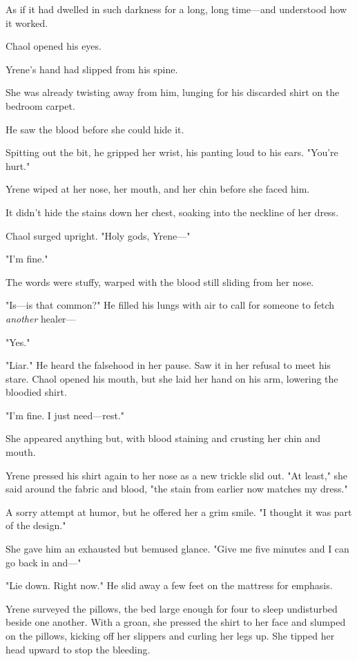 As if it had dwelled in such darkness for a long, long time---and understood how it worked.

Chaol opened his eyes.

Yrene's hand had slipped from his spine.

She was already twisting away from him, lunging for his discarded shirt on the bedroom carpet.

He saw the blood before she could hide it.

Spitting out the bit, he gripped her wrist, his panting loud to his ears. "You're hurt."

Yrene wiped at her nose, her mouth, and her chin before she faced him.

It didn't hide the stains down her chest, soaking into the neckline of her dress.

Chaol surged upright. "Holy gods, Yrene---"

"I'm fine."

The words were stuffy, warped with the blood still sliding from her nose.

"Is---is that common?" He filled his lungs with air to call for someone to fetch \emph{another} healer---

"Yes."

"Liar." He heard the falsehood in her pause. Saw it in her refusal to meet his stare. Chaol opened his mouth, but she laid her hand on his arm, lowering the bloodied shirt.

"I'm fine. I just need---rest."

She appeared anything but, with blood staining and crusting her chin and mouth.

Yrene pressed his shirt again to her nose as a new trickle slid out. "At least," she said around the fabric and blood, "the stain from earlier now matches my dress."

A sorry attempt at humor, but he offered her a grim smile. "I thought it was part of the design."

She gave him an exhausted but bemused glance. "Give me five minutes and I can go back in and---"

"Lie down. Right now." He slid away a few feet on the mattress for emphasis.

Yrene surveyed the pillows, the bed large enough for four to sleep undisturbed beside one another. With a groan, she pressed the shirt to her face and slumped on the pillows, kicking off her slippers and curling her legs up. She tipped her head upward to stop the bleeding.

